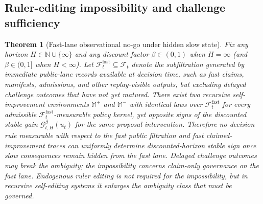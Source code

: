 \documentclass[11pt]{article}
\newtheorem{theorem}{Theorem}[section]
\theoremstyle{definition}
\newcommand{\N}{\mathbb{N}}
\newcommand{\1}{\mathbf{1}}
\begin{document}
\subsection{Ruler-editing impossibility and challenge sufficiency}
\begin{theorem}[Fast-lane observational no-go under hidden slow state]\label{thm:ruler_nogo}
Fix any horizon $H\in\N\cup\{\infty\}$ and any discount factor $\beta\in(0,1)$ when $H=\infty$ (and $\beta\in(0,1]$ when $H<\infty$). Let $\mathcal F_t^{\mathrm{fast}}\subseteq \mathcal F_t$ denote the subfiltration generated by immediate public-lane records available at decision time, such as fast claims, manifests, admissions, and other replay-visible outputs, but excluding delayed challenge outcomes that have not yet matured. There exist two recursive self-improvement environments $\mathbb M^+$ and $\mathbb M^-$ with identical laws over $\mathcal F_t^{\mathrm{fast}}$ for every admissible $\mathcal F_t^{\mathrm{fast}}$-measurable policy kernel, yet opposite signs of the discounted stable gain $\mathcal G_{t,H}^{\beta}(u_t)$ for the same proposal intervention. Therefore no decision rule measurable with respect to the fast public filtration and fast claimed-improvement traces can uniformly determine discounted-horizon stable sign once slow consequences remain hidden from the fast lane. Delayed challenge outcomes may break the ambiguity; the impossibility concerns claim-only governance on the fast lane. Endogenous ruler editing is not required for the impossibility, but in recursive self-editing systems it enlarges the ambiguity class that must be governed.
\end{theorem}
\end{document}
